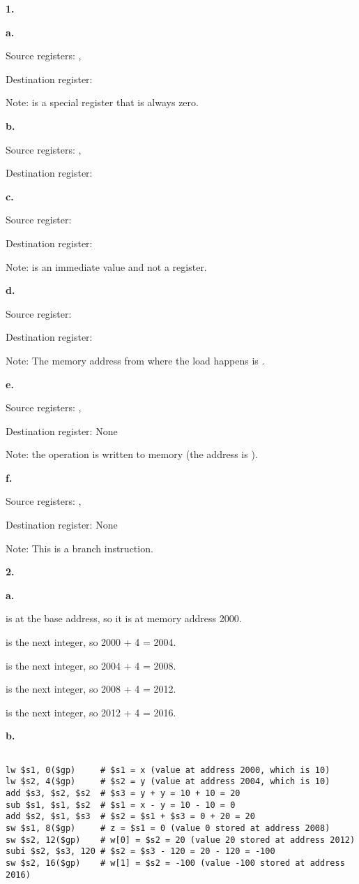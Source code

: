 \documentclass{article}
\newcommand{\lskip}{\newpage}
\begin{document}
\textbf{1.}

\textbf{a.}

Source registers: , 

Destination register: 

Note:  is a special register that is always zero.

\textbf{b.}

Source registers: , 

Destination register: 

\textbf{c.}

Source register: 

Destination register: 

Note:  is an immediate value and not a register.

\textbf{d.}

Source register: 

Destination register: 

Note: The memory address from where the load happens is .

\textbf{e.}

Source registers: , 

Destination register: None

Note: the operation is written to memory (the address is ).

\textbf{f.}

Source registers: , 

Destination register: None

Note: This is a branch instruction.

\lskip

\textbf{2.}

\textbf{a.}

 is at the base address, so it is at memory address 2000.

 is the next integer, so 2000 + 4 = 2004.

 is the next integer, so 2004 + 4 = 2008.

 is the next integer, so 2008 + 4 = 2012.

 is the next integer, so 2012 + 4 = 2016.

\textbf{b.}

\begin{lstlisting}

lw $s1, 0($gp)     # $s1 = x (value at address 2000, which is 10)
lw $s2, 4($gp)     # $s2 = y (value at address 2004, which is 10)
add $s3, $s2, $s2  # $s3 = y + y = 10 + 10 = 20
sub $s1, $s1, $s2  # $s1 = x - y = 10 - 10 = 0
add $s2, $s1, $s3  # $s2 = $s1 + $s3 = 0 + 20 = 20
sw $s1, 8($gp)     # z = $s1 = 0 (value 0 stored at address 2008)
sw $s2, 12($gp)    # w[0] = $s2 = 20 (value 20 stored at address 2012)
subi $s2, $s3, 120 # $s2 = $s3 - 120 = 20 - 120 = -100
sw $s2, 16($gp)    # w[1] = $s2 = -100 (value -100 stored at address 2016)

\end{lstlisting}
\end{document}
